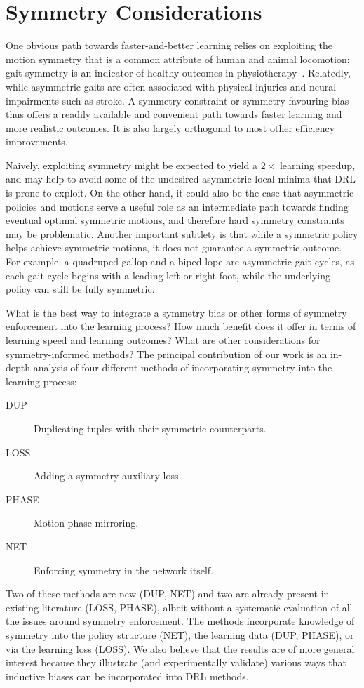 \chapter{Symmetry Considerations}
\label{ch:symmetry}



One obvious path towards faster-and-better learning relies on exploiting the motion symmetry
that is a common attribute of human and animal locomotion;
gait symmetry is an indicator of healthy outcomes in 
physiotherapy~\citep{robinson1987use, riskowski}.
Relatedly, while asymmetric gaits are often associated 
with physical injuries and neural impairments such as stroke.  
A symmetry constraint or symmetry-favouring bias thus offers a readily available and convenient 
path towards faster learning and more realistic outcomes. 
It is also largely orthogonal to most other efficiency improvements.

Naively, exploiting symmetry might be expected to yield a $2\times$ learning speedup, and may help to avoid
some of the undesired asymmetric local minima that \ac{DRL} is prone to exploit.  On the other hand,
it could also be the case that asymmetric policies and motions serve a useful role as an intermediate path 
towards finding eventual optimal symmetric motions, and therefore
hard symmetry constraints may be problematic.
Another important subtlety is that while a symmetric policy helps achieve symmetric motions,
it does not guarantee a symmetric outcome.
For example, a quadruped gallop and a biped lope are asymmetric gait cycles, 
as each gait cycle begins with a leading left or right foot, while the underlying 
policy can still be fully symmetric.

What is the best way to integrate a symmetry bias or other forms of symmetry enforcement into the learning process?
How much benefit does it offer in terms of learning speed and learning outcomes?
What are other considerations for symmetry-informed methods?
The principal contribution of our work is an in-depth analysis of four different methods
of incorporating symmetry into the learning process:
\begin{description}
\item [DUP]  Duplicating tuples with their symmetric counterparts.
\item [LOSS] Adding a symmetry auxiliary loss.
\item [PHASE] Motion phase mirroring.
\item [NET]  Enforcing symmetry in the network itself.
\end{description}
Two of these methods are new (DUP, NET) and two are already present in existing literature (LOSS, PHASE), 
albeit without a systematic evaluation of all the issues around symmetry enforcement. 
The methods incorporate knowledge of symmetry into the policy structure (NET), 
the learning data (DUP, PHASE), or via the learning loss (LOSS). 
We also believe that the results are of more general interest because they 
illustrate (and experimentally validate) various ways that inductive biases 
can be incorporated into \ac{DRL} methods.

